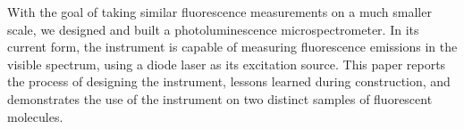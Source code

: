 With the goal of taking similar fluorescence measurements on a much smaller scale, we designed and built a photoluminescence microspectrometer. In its current form, the instrument is capable of measuring fluorescence emissions in the visible spectrum, using a diode laser as its excitation source. This paper reports the process of designing the instrument, lessons learned during construction, and demonstrates the use of the instrument on two distinct samples of fluorescent molecules.
